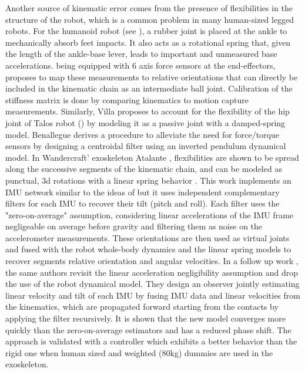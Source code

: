 Another source of kinematic error comes from the presence of flexibilities in the structure of the robot, which is a common problem in many human-sized legged robots. 
For the  humanoid robot (see ), a rubber joint is placed at the ankle to mechanically absorb feet impacts. 
It also acts as a rotational spring that, given the length of the ankle-base lever, 
leads to important and unmeasured base accelerations.  being equipped with 6 axis 
force sensors at the end-effectors, \cite{flayols2017experimental} proposes to map these measurements to relative orientations that can 
directly be included in the kinematic chain as an intermediate ball joint. Calibration of the stiffness matrix is done by comparing 
kinematics to motion capture measurements. Similarly, Villa \cite{villa2022addressing} proposes to account for the flexibility of the hip joint of Talos robot 
\cite{stasse2017talos} () by modeling it as a passive joint with a damped-spring model.
Benallegue \cite{benallegue2015estimation} derives a procedure to alleviate the need for force/torque sensors by 
designing a centroidal filter using an inverted pendulum dynamical model. 
In Wandercraft' exoskeleton Atalante \cite{harib2018feedback}, flexibilities
are shown to be spread along the successive segments of the kinematic chain, and can be modeled as punctual, 
3d rotations with a linear spring behavior \cite{vigne2018estimation}. This work implements an IMU network similar to the ideas of 
\cite{xinjilefu2016distributed,rotella2016imu} but it uses independent complementary filters for each IMU to recover their tilt (pitch and roll). 
Each filter uses the "zero-on-average" assumption, considering linear accelerations of the IMU frame negligeable on average before gravity and 
filtering them as noise on the accelerometer measurements. These orientations are then used as virtual joints and fused with the robot whole-body dynamics and the linear spring models to recover segments 
relative orientation and angular velocities. In a follow up work \cite{vigne2022movie}, the same authors revisit the linear acceleration negligibility 
assumption and drop the use of the robot dynamical model. They design an observer jointly estimating linear velocity and tilt 
of each IMU by fusing IMU data and linear velocities from the kinematics, which are propagated forward starting from the contacts by applying the filter recursively. 
It is shown that the new model converges more quickly than the zero-on-average estimators and has a reduced phase shift. 
The approach is validated with a controller which exhibits a better behavior than the rigid one when human sized and weighted (80kg) dummies are used in the exoskeleton. 

